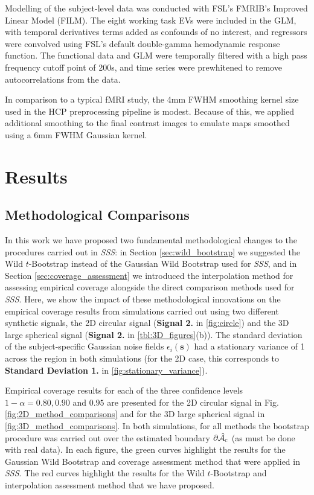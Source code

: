 Modelling of the subject-level data was conducted with FSL's FMRIB's Improved Linear Model (FILM). The eight working task EVs were included in the GLM, with temporal derivatives terms added as confounds of no interest, and regressors were convolved using FSL's default double-gamma hemodynamic response function. The functional data and GLM were temporally filtered with a high pass frequency cutoff point of 200s, and time series were prewhitened to remove autocorrelations from the data.

In comparison to a typical fMRI study, the 4mm FWHM smoothing kernel size used in the HCP preprocessing pipeline is modest. Because of this, we applied additional smoothing to the final contrast images to emulate maps smoothed using a 6mm FWHM Gaussian kernel.

\section{Results}
\label{sec:Results}
\subsection{Methodological Comparisons}
\label{sec:method_comparisons}
In this work we have proposed two fundamental methodological changes to the procedures carried out in \textit{SSS}: in Section \ref{sec:wild_bootstrap} we suggested the Wild $t$-Bootstrap instead of the Gaussian Wild Bootstrap used for \textit{SSS}, and in Section \ref{sec:coverage_assessment} we introduced the interpolation method for assessing empirical coverage alongside the direct comparison methods used for \textit{SSS}. Here, we show the impact of these methodological innovations on the empirical coverage results from simulations carried out using two different synthetic signals, the 2D circular signal (\textbf{Signal 2.} in \ref{fig:circle}) and the 3D large spherical signal (\textbf{Signal 2.} in \ref{tbl:3D_figures}(b)). The standard deviation of the subject-specific Gaussian noise fields $\epsilon_i(\bm{s})$ had a stationary variance of 1 across the region in both simulations (for the 2D case, this corresponds to \textbf{Standard Deviation 1.} in \ref{fig:stationary_variance}).

Empirical coverage results for each of the three confidence levels $1 - \alpha = 0.80, 0.90$ and $0.95$ are presented for the 2D circular signal in Fig. \ref{fig:2D_method_comparisons} and for the 3D large spherical signal in \ref{fig:3D_method_comparisons}. In both simulations, for all methods the bootstrap procedure was carried out over the estimated boundary $\operatorname{\partial\hat{\mathcal{A}}_{c}}$ (as must be done with real data). In each figure, the green curves highlight the results for the Gaussian Wild Bootstrap and coverage assessment method that were applied in \textit{SSS}. The red curves highlight the results for the Wild $t$-Bootstrap and interpolation assessment method that we have proposed.  

